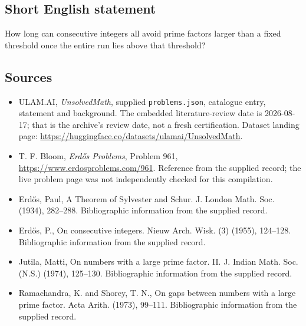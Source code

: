 \documentclass[11pt,a4paper]{article}
\begin{document}
\subsection{Short English statement}

How long can consecutive integers all avoid prime factors larger than a fixed threshold once the entire run lies above that threshold?

\subsection{Sources}

{\small

\begin{itemize}

\item[\hypertarget{source:statement:1}{S1}] ULAM.AI, \emph{UnsolvedMath}, supplied \texttt{problems.json}, catalogue entry, statement and background. The embedded literature-review date is 2026-08-17; that is the archive’s review date, not a fresh certification. Dataset landing page: \url{https://huggingface.co/datasets/ulamai/UnsolvedMath}.

\item[\hypertarget{source:statement:2}{S2}] T. F. Bloom, \emph{Erdős Problems}, Problem 961, \url{https://www.erdosproblems.com/961}. Reference from the supplied record; the live problem page was not independently checked for this compilation.

\item[\hypertarget{source:statement:3}{S3}] Erd\H{o}s, Paul, A {T}heorem of {S}ylvester and {S}chur. J. London Math. Soc. (1934), 282--288. Bibliographic information from the supplied record.

\item[\hypertarget{source:statement:4}{S4}] Erd\H{o}s, P., On consecutive integers. Nieuw Arch. Wisk. (3) (1955), 124--128. Bibliographic information from the supplied record.

\item[\hypertarget{source:statement:5}{S5}] Jutila, Matti, On numbers with a large prime factor. {II}. J. Indian Math. Soc. (N.S.) (1974), 125--130. Bibliographic information from the supplied record.

\item[\hypertarget{source:statement:6}{S6}] Ramachandra, K. and Shorey, T. N., On gaps between numbers with a large prime factor. Acta Arith. (1973), 99--111. Bibliographic information from the supplied record.

\end{itemize}

}

\label{end:statement}
\end{document}
